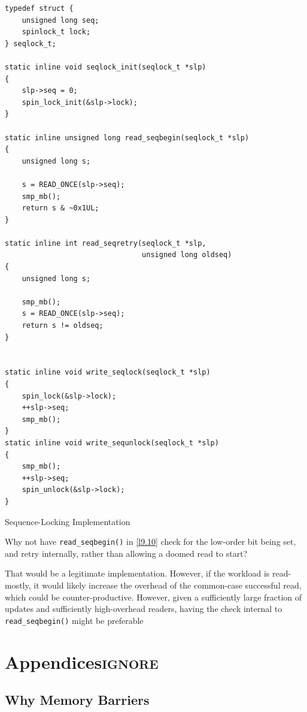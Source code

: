 \documentclass[11pt]{article}
\begin{document}
\begin{listing}[htbp]
\begin{verbatim}
typedef struct {
    unsigned long seq;
    spinlock_t lock;
} seqlock_t;

static inline void seqlock_init(seqlock_t *slp)
{
    slp->seq = 0;
    spin_lock_init(&slp->lock);
}

static inline unsigned long read_seqbegin(seqlock_t *slp)
{
    unsigned long s;

    s = READ_ONCE(slp->seq);
    smp_mb();
    return s & ~0x1UL;
}

static inline int read_seqretry(seqlock_t *slp,
                                unsigned long oldseq)
{
    unsigned long s;

    smp_mb();
    s = READ_ONCE(slp->seq);
    return s != oldseq;
}


static inline void write_seqlock(seqlock_t *slp)
{
    spin_lock(&slp->lock);
    ++slp->seq;
    smp_mb();
}
static inline void write_sequnlock(seqlock_t *slp)
{
    smp_mb();
    ++slp->seq;
    spin_unlock(&slp->lock);
}
\end{verbatim}
\caption{\label{l9.10}Sequence-Locking Implementation}
\end{listing}

\begin{remark}[]
Why not have \texttt{read\_seqbegin()} in \ref{l9.10} check for the low-order bit being set, and retry internally,
rather than allowing a doomed read to start?

That would be a legitimate implementation. However, if the workload is read-mostly, it would likely
increase the overhead of the common-case successful read, which could be counter-productive. However,
given a sufficiently large fraction of updates and sufficiently high-overhead readers, having the
check internal to \texttt{read\_seqbegin()} might be preferable
\end{remark}
\section{Appendices\hfill{}\textsc{ignore}}
\label{sec:org1830971}
\appendix
\subsection{Why Memory Barriers}
\label{sec:org4c393e9}
\end{document}
